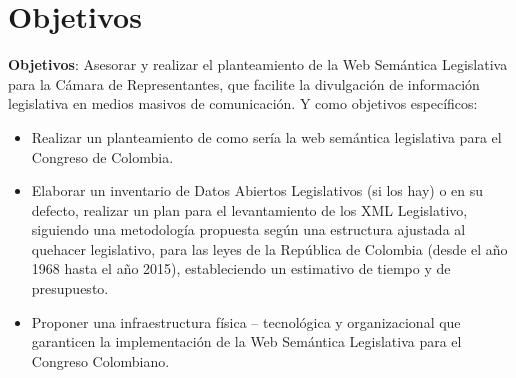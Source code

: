 \documentclass[conference]{IEEEtran}
\begin{document}
			
	
			


	

\section{Objetivos}
   \textbf{Objetivos}: Asesorar y realizar el planteamiento  de la Web Semántica Legislativa para la Cámara de Representantes, que facilite la divulgación de información legislativa en medios masivos de comunicación. Y como objetivos específicos:%
   \begin{itemize}
   	  \item Realizar un planteamiento de como sería la web semántica legislativa para el Congreso de Colombia.%
   	  \item Elaborar un inventario de Datos Abiertos Legislativos (si los hay) o en su defecto, realizar un plan para el levantamiento de los XML Legislativo, siguiendo una metodología propuesta según una estructura ajustada al quehacer legislativo, para las leyes de la República de Colombia (desde el año 1968 hasta el año 2015), estableciendo un estimativo de tiempo y de presupuesto.%
   	  \item Proponer una infraestructura física – tecnológica y organizacional que garanticen la implementación de la Web Semántica Legislativa para el Congreso Colombiano.%
   \end{itemize}
\end{document}

